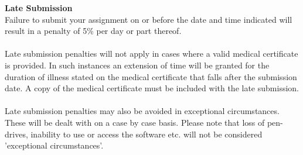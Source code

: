 \vspace{1cm}
\textbf{Late Submission}\\
Failure to submit your assignment on or before the date and time indicated will result in a penalty of 5\% per day or part thereof.
\\
\\
Late submission penalties will not apply in cases where a valid medical certificate is provided.  In such instances an extension of time will be granted for the duration of illness stated on the medical certificate that falls after the submission date.  A copy of the medical certificate must be included with the late submission.
\\
\\
Late submission penalties may also be avoided in exceptional circumstances.  These will be dealt with on a case by case basis.  Please note that loss of pen-drives, inability to use or access the software etc. will not be considered 'exceptional circumstances'.